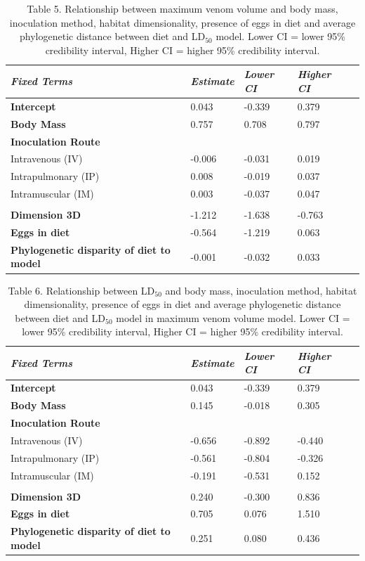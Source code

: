 \begin{table}[H]
  \centering
    \caption*{Table 5. Relationship between maximum venom volume and body mass, inoculation method, habitat dimensionality, presence of eggs in diet and average phylogenetic distance between diet and LD$_{50}$ model. Lower CI = lower 95\% credibility interval, Higher CI = higher 95\% credibility interval. }
\begin{tabular}{*5l}    \toprule
\emph{Fixed Terms} & \emph{Estimate} & \emph{Lower CI} & \emph{Higher CI}\\\midrule
\textbf{Intercept} & 0.043  & -0.339 & 0.379 \\ 
\textbf{Body Mass} & 0.757  & 0.708 & 0.797 \\ 
\textbf{Inoculation Route} &  &  &  \\ 
 Intravenous (IV) & -0.006 & -0.031 & 0.019 \\
 Intrapulmonary (IP) & 0.008 & -0.019 & 0.037 \\ 
 Intramuscular (IM) & 0.003 & -0.037 & 0.047 \\
  &  &  &  \\ 
\textbf{Dimension 3D} & -1.212 & -1.638 & -0.763 \\ 
\textbf{Eggs in diet} & -0.564 & -1.219 & 0.063 \\ 
\textbf{Phylogenetic disparity of diet to model} & -0.001 & -0.032 & 0.033 \\\bottomrule
 \hline
\end{tabular}
  \label{tbl:Table 5.}
\end{table}



\begin{table}[H]
  \centering
    \caption[ ]{Table 6. Relationship between LD$_{50}$ and body mass, inoculation method, habitat dimensionality, presence of eggs in diet and average phylogenetic distance between diet and LD$_{50}$ model in maximum venom volume model. Lower CI = lower 95\% credibility interval, Higher CI = higher 95\% credibility interval.}
\begin{tabular}{*5l}    \toprule
\emph{Fixed Terms} & \emph{Estimate} & \emph{Lower CI} & \emph{Higher CI}\\\midrule
\textbf{Intercept} & 0.043  & -0.339 & 0.379 \\ 
\textbf{Body Mass} & 0.145  & -0.018 & 0.305 \\ 
\textbf{Inoculation Route} &  &  &  \\ 
 Intravenous (IV) & -0.656 & -0.892 & -0.440 \\
 Intrapulmonary (IP) & -0.561 & -0.804 & -0.326 \\ 
 Intramuscular (IM) & -0.191 & -0.531 & 0.152 \\
  &  &  &  \\ 
\textbf{Dimension 3D} & 0.240 & -0.300 & 0.836 \\ 
\textbf{Eggs in diet} & 0.705 & 0.076 & 1.510 \\ 
\textbf{Phylogenetic disparity of diet to model} & 0.251 & 0.080 & 0.436 \\\bottomrule
 \hline
\end{tabular}
  \label{tbl:Table 6.}
\end{table}




